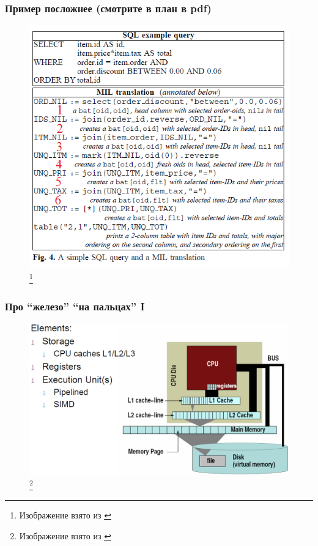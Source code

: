 \documentclass{beamer}
\begin{document}
\begin{frame}
\frametitle{Пример посложнее (смотрите в план в pdf)}

\begin{figure}[htb]
	\includegraphics[width=\textwidth,height=0.750\textheight,keepaspectratio]{example2.png} 
	\footnote{\tiny{Изображение взято из \cite{Boncz1999}}}
\end{figure}    

\end{frame}



\begin{frame}
\frametitle{Про ``железо'' ``на пальцах'' I}

\begin{figure}[htb]
\includegraphics[width=\textwidth,height=0.750\textheight,keepaspectratio]{processor.png} 
\footnote{\tiny{Изображение взято из \cite{Harizopoulos2009}}}
\end{figure}    
  
\end{frame}
\end{document}
